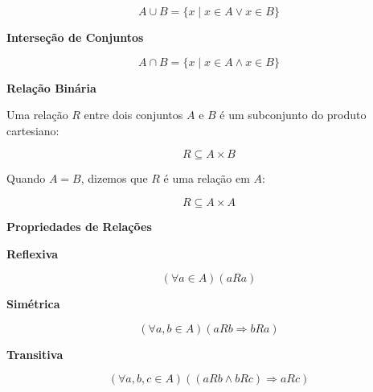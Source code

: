 \documentclass[12pt,a4paper]{article}
\begin{document}
\[
A \cup B = \{x \mid x \in A \lor x \in B\}
\]

\vspace{0.3cm}

\textbf{Interseção de Conjuntos}

\[
A \cap B = \{x \mid x \in A \land x \in B\}
\]

\vspace{0.3cm}

\textbf{Relação Binária}

Uma relação $R$ entre dois conjuntos $A$ e $B$ é um subconjunto do produto cartesiano:

\[
R \subseteq A \times B
\]

Quando $A=B$, dizemos que $R$ é uma relação em $A$:

\[
R \subseteq A \times A
\]

\vspace{0.3cm}

\textbf{Propriedades de Relações}

\textbf{Reflexiva}

\[
(\forall a \in A)(aRa)
\]

\textbf{Simétrica}

\[
(\forall a,b \in A)(aRb \Rightarrow bRa)
\]

\textbf{Transitiva}

\[
(\forall a,b,c \in A)((aRb \land bRc) \Rightarrow aRc)
\]
\end{document}
